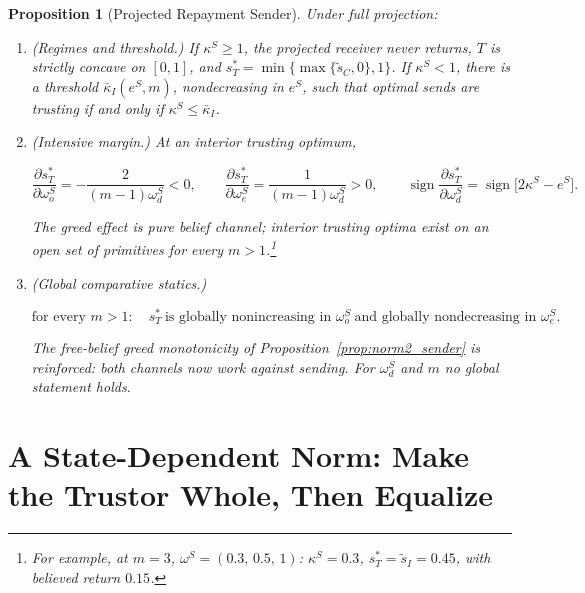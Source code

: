\documentclass[11pt]{article}
\theoremstyle{plain}
\newtheorem{proposition}{Proposition}
\theoremstyle{remark}
\newcommand{\sgn}{\operatorname{sign}}
\begin{document}
\begin{proposition}[Projected Repayment Sender]
\label{prop:norm2_projection}
Under full projection:
\begin{enumerate}[topsep=2pt,itemsep=2pt]
\item \emph{(Regimes and threshold.)}  If $\kappa^S\ge1$, the projected receiver never returns, $T$ is strictly concave on $[0,1]$, and $s_T^\ast=\min\{\max\{\tilde s_C,0\},1\}$.  If $\kappa^S<1$, there is a threshold $\bar\kappa_I(e^S,m)$, nondecreasing in $e^S$, such that optimal sends are trusting if and only if $\kappa^S\le\bar\kappa_I$.
\item \emph{(Intensive margin.)}  At an interior trusting optimum,
\begin{csbox}
\[
        \frac{\partial s_T^\ast}{\partial\omega_o^S}=-\frac{2}{(m-1)\omega_d^S}<0,
        \qquad
        \frac{\partial s_T^\ast}{\partial\omega_e^S}=\frac{1}{(m-1)\omega_d^S}>0,
        \qquad
        \sgn\frac{\partial s_T^\ast}{\partial\omega_d^S}=\sgn\big[2\kappa^S-e^S\big].
\]
\end{csbox}
The greed effect is pure belief channel; interior trusting optima exist on an open set of primitives for every $m>1$.\footnote{For example, at $m=3$, $\omega^S=(0.3,\,0.5,\,1)$: $\kappa^S=0.3$, $s_T^\ast=\tilde s_I=0.45$, with believed return $0.15$.}
\item \emph{(Global comparative statics.)}
\begin{csbox}
\[
        \text{for every }m>1:\quad
        s_T^\ast\ \text{is globally nonincreasing in }\omega_o^S\ \text{and globally nondecreasing in }\omega_e^S.
\]
\end{csbox}
The free-belief greed monotonicity of Proposition~\ref{prop:norm2_sender} is reinforced: both channels now work against sending.  For $\omega_d^S$ and $m$ no global statement holds.
\end{enumerate}
\end{proposition}

\iffalse
\section{A State-Dependent Norm: Make the Trustor Whole, Then Equalize}
\label{sec:norm_compound}
\end{document}
